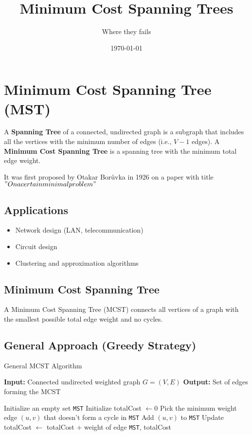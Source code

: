 \documentclass[a4paper,14pt]{extarticle}
\title{Minimum Cost Spanning Trees}
\author{Where they fails}
\date{\today}
\begin{document}
\maketitle
\tableofcontents
\lstlistoflistings
\listofalgorithms
\listoftables
\newpage
\section{Minimum Cost Spanning Tree (MST)}

A \textbf{Spanning Tree} of a connected, undirected graph is a subgraph that includes 
all the vertices with the minimum number of edges (i.e., $V-1$ edges). 
A \textbf{Minimum Cost Spanning Tree} is a spanning tree with the minimum total edge weight.

It was first proposed by Otakar Borůvka\cite{boruvka1926} in 1926 on a paper with title $"On a certain minimal problem"$


\subsection*{Applications}
\begin{itemize}
    \item Network design (LAN, telecommunication)\cite{gallager1983}
    \item Circuit design
    \item Clustering and approximation algorithms
\end{itemize}

\subsection{Minimum Cost Spanning Tree}

A Minimum Cost Spanning Tree (MCST) connects all vertices of a graph with the smallest possible total edge weight and no cycles.

\subsection{General Approach (Greedy Strategy)}

\begin{algorithm}[H]
\caption{General MCST Algorithm}
\begin{algorithmic}[1]
\State \textbf{Input:} Connected undirected weighted graph \(G = (V, E)\)
\State \textbf{Output:} Set of edges forming the MCST

    \State Initialize an empty set \texttt{MST}
    \State Initialize totalCost \( \gets 0 \)
        \State Pick the minimum weight edge \( (u, v) \) that doesn't form a cycle in \texttt{MST}
        \State Add \( (u, v) \) to \texttt{MST}
        \State Update totalCost \( \gets \) totalCost $+$ weight of edge
    \EndWhile
    \State \Return \texttt{MST}, totalCost
\EndFunction
\end{algorithmic}
\end{algorithm}
\end{document}
